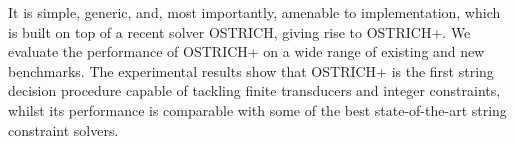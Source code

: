 It is simple, generic, and, most importantly, amenable to implementation, which 
is built on top of a recent solver OSTRICH,
giving rise to OSTRICH+.
We evaluate the performance of OSTRICH+ on  a wide range of existing and new benchmarks. The experimental results show that OSTRICH+ is the first string decision procedure capable of tackling finite transducers and integer constraints, whilst
its performance is comparable with some of the best state-of-the-art string constraint solvers.

